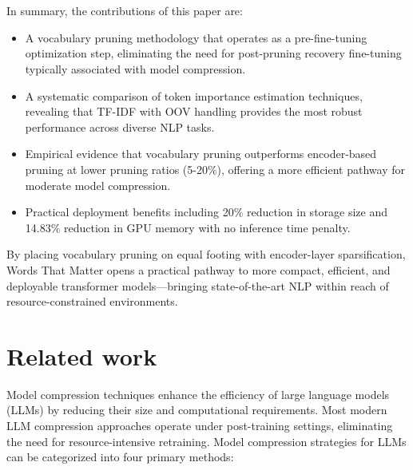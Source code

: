 \documentclass[twocolumn]{article}
\begin{document}
\\ \\
In summary, the contributions of this paper are:

\begin{itemize}
    \item A vocabulary pruning methodology that operates as a pre-fine-tuning optimization step, eliminating the need for post-pruning recovery fine-tuning typically associated with model compression.
    
    \item A systematic comparison of token importance estimation techniques, revealing that TF-IDF with OOV handling provides the most robust performance across diverse NLP tasks.
    
    \item Empirical evidence that vocabulary pruning outperforms encoder-based pruning at lower pruning ratios (5-20\%), offering a more efficient pathway for moderate model compression.
    
    \item Practical deployment benefits including 20\% reduction in storage size and 14.83\% reduction in GPU memory with no inference time penalty.
\end{itemize}
By placing vocabulary pruning on equal footing with encoder-layer sparsification, Words That Matter opens a practical pathway to more compact, efficient, and deployable transformer models---bringing state-of-the-art NLP within reach of resource-constrained environments.

\section{Related work}
Model compression techniques enhance the efficiency of large language models (LLMs) by reducing their size and computational requirements. Most modern LLM compression approaches operate under post-training settings, eliminating the need for resource-intensive retraining. Model compression strategies for LLMs can be categorized into four primary methods:
\end{document}
